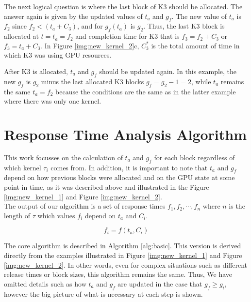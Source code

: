 \documentclass[
  12pt,
  a4paperpaper,
]{report}
\begin{document}
The next logical question is where the last block of K3 should be
allocated. The answer again is given by the updated values of \(t_a\)
and \(g_f\). 
The new value of \(t_a\) is \(f_2\) since \(f_2 <( t_a + C_3 )\), and for  \(g_f(t_a)\) is \(g_2\). 
Thus, the last K3 block is allocated at \(t=t_a=f_2\) and  completion time for K3 that is \(f_3 = f_2+C_3\) or \(f_3 = t_a + C_3\).
In Figure \ref{img:new_kernel_2}c,  \(C^{*}_3\) is the total amount of time in which K3 was using GPU resources.

After K3 is allocated, \(t_a\) and \(g_f\) should be updated again. In
this example, the new \(g_f\) is  \(g_2\) minus the last
allocated K3 blocks \(g_f = g_2 - 1 = 2\), while \(t_a\) remains the
same \(t_a = f_2\) because the conditions are the same as in the latter
example where there was only one kernel.

\hypertarget{response-time-analysis-algorithm}{%
\section{Response Time Analysis
Algorithm}\label{response-time-analysis-algorithm}}

This work focusses on the calculation of \(t_a\) and \(g_f\) for
each block regardless of which kernel \(\tau_i\) comes from. In addition, it is
important to note that \(t_a\) and \(g_f\) depend on how previous
blocks were allocated and on the GPU state at some point in time, as it
was described above and illustrated in the Figure \ref{img:new_kernel_1}
and Figure \ref{img:new_kernel_2}.\\
The output of our algorithm is a set of response times
\({f_1, f_2, \cdots, f_n}\) where \(n\) is the length of \(\tau\) which
values \(f_i\) depend on \(t_a\) and \(C_i\).

\begin{equation}
f_i = f(t_a, C_i)
\end{equation}

The core algorithm is described in Algorithm \ref{alg:basic}. 
This version is derived directly from the examples
illustrated in Figure \ref{img:new_kernel_1} and Figure
\ref{img:new_kernel_2}.
In other words, even for complex situations such as different release times or block sizes, this algorithm remains the same.
Thus, We have omitted details such as how \(t_a\) and \(g_f\) are updated in the case that \(g_f \geq g_i\), however the big picture of what is necessary at each step is shown.
\end{document}
